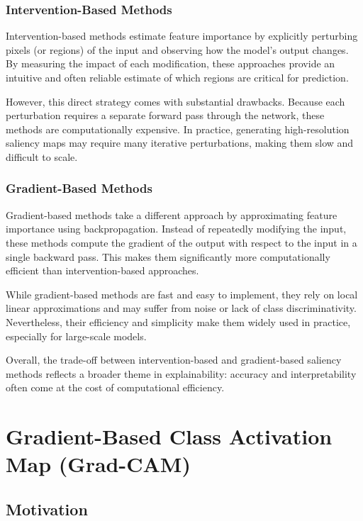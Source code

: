 \documentclass{article}
\begin{document}
\subsubsection{Intervention-Based Methods}

Intervention-based methods estimate feature importance by explicitly perturbing pixels (or regions) of the input and observing how the model’s output changes. By measuring the impact of each modification, these approaches provide an intuitive and often reliable estimate of which regions are critical for prediction.

However, this direct strategy comes with substantial drawbacks. Because each perturbation requires a separate forward pass through the network, these methods are computationally expensive. In practice, generating high-resolution saliency maps may require many iterative perturbations, making them slow and difficult to scale.

\subsubsection*{Gradient-Based Methods}

Gradient-based methods take a different approach by approximating feature importance using backpropagation. Instead of repeatedly modifying the input, these methods compute the gradient of the output with respect to the input in a single backward pass. This makes them significantly more computationally efficient than intervention-based approaches.

While gradient-based methods are fast and easy to implement, they rely on local linear approximations and may suffer from noise or lack of class discriminativity. Nevertheless, their efficiency and simplicity make them widely used in practice, especially for large-scale models.

Overall, the trade-off between intervention-based and gradient-based saliency methods reflects a broader theme in explainability: accuracy and interpretability often come at the cost of computational efficiency.

\section{Gradient-Based Class Activation Map (Grad-CAM)}

\subsection{Motivation}
\end{document}
